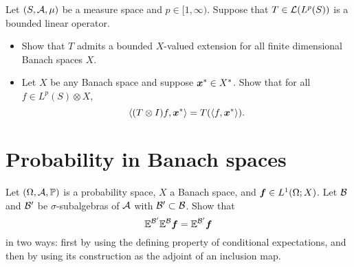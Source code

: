 \documentclass[a4paper,10pt]{amsbook}
\begin{document}
\begin{exercise}\label{ex:tensor-extension-basic-props}
  Let $(S, \mathcal{A}, \mu)$ be a measure space and $p \in [1,\infty)$.
  Suppose that $T \in \mathcal{L}(L^{p}(S))$ is a bounded linear operator.
  \begin{itemize}
  \item{}
    Show that $T$ admits a bounded $X$-valued extension for all finite dimensional Banach spaces $X$.
  \item{}
    Let $X$ be any Banach space and suppose $\bm{x}^* \in X^*$.
    Show that for all $f \in L^{p}(S) \otimes X$,
    \begin{equation*}
      \langle (T \otimes I)f, \bm{x}^* \rangle = T(\langle f, \bm{x}^* \rangle).
    \end{equation*}
  \end{itemize}

\end{exercise}

\section{Probability in Banach spaces}

\begin{exercise}\label{ex:CE-monotonicity}
  Let $(\Omega,\mathcal{A},\mathbb{P})$ is a probability space, $X$ a Banach space, and $\bm{f} \in L^1(\Omega;X)$.
  Let $\mathcal{B}$ and $\mathcal{B}'$ be $\sigma$-subalgebras of $\mathcal{A}$ with $\mathcal{B}' \subset \mathcal{B}$.
  Show that
  \begin{equation*}
    \mathbb{E}^{\mathcal{B}'} \mathbb{E}^{\mathcal{B}} \bm{f} = \mathbb{E}^{\mathcal{B}'} \bm{f}
  \end{equation*}
  in two ways: first by using the defining property of conditional expectations, and then by using its construction as the adjoint of an inclusion map.
\end{exercise}
\end{document}
